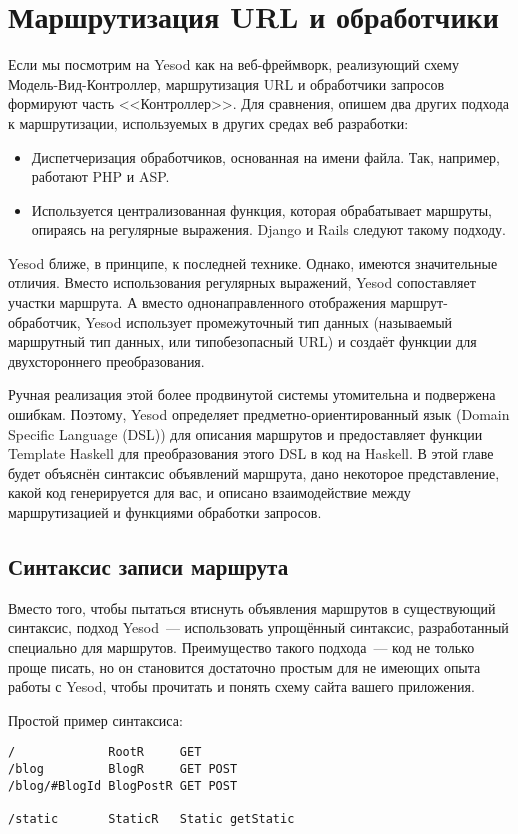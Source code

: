 \chapter{Маршрутизация URL и обработчики}\label{ch:routing}
Если мы посмотрим на Yesod как на веб-фреймворк, реализующий схему
Модель-Вид-Контроллер, маршрутизация URL и обработчики запросов
формируют часть <<Контроллер>>. Для сравнения, опишем два других
подхода к маршрутизации, используемых в других средах веб разработки:
\begin{itemize}
\item Диспетчеризация обработчиков, основанная на имени файла. Так,
  например, работают PHP и ASP.

\item Используется централизованная функция, которая обрабатывает
  маршруты, опираясь на регулярные выражения. Django и Rails
  следуют такому подходу.
\end{itemize}

Yesod ближе, в принципе, к последней технике. Однако, имеются
значительные отличия. Вместо использования регулярных выражений, Yesod
сопоставляет участки маршрута. А вместо однонаправленного отображения
маршрут-обработчик, Yesod использует промежуточный тип данных
(называемый маршрутный тип данных, или типобезопасный URL) и создаёт
функции для двухстороннего преобразования.

Ручная реализация этой более продвинутой системы утомительна и
подвержена ошибкам. Поэтому, Yesod определяет предметно-ориентированный
язык (Domain Specific Language (DSL)) для описания маршрутов и
предоставляет функции Template Haskell для преобразования этого DSL в
код на Haskell. В этой главе будет объяснён синтаксис объявлений
маршрута, дано некоторое представление, какой код генерируется для
вас, и описано взаимодействие между маршрутизацией и функциями
обработки запросов.

\section{Синтаксис записи маршрута}
Вместо того, чтобы пытаться втиснуть объявления маршрутов в
существующий синтаксис, подход Yesod~--- использовать упрощённый
синтаксис, разработанный специально для маршрутов. Преимущество такого
подхода~--- код не только проще писать, но он становится достаточно
простым для не имеющих опыта работы с Yesod, чтобы прочитать и понять
схему сайта вашего приложения.

Простой пример синтаксиса:
\begin{verbatim}
/             RootR     GET
/blog         BlogR     GET POST
/blog/#BlogId BlogPostR GET POST

/static       StaticR   Static getStatic
\end{verbatim}

